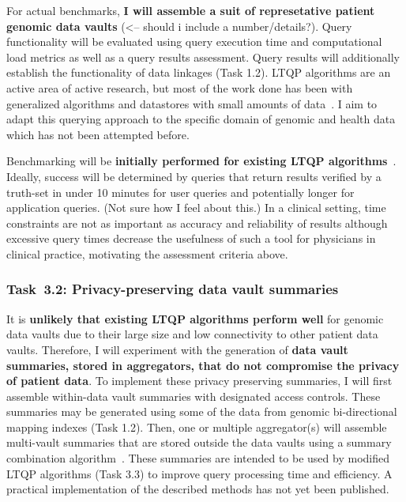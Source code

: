 \documentclass[a4paper,11pt]{article}
\begin{document}
\begin{refsection}
For actual benchmarks, \textbf{I will assemble a suit of represetative patient genomic data vaults} (<-- should i include a number/details?).
Query functionality will be evaluated using query execution time and computational load metrics as well as a query results assessment. 
Query results will additionally establish the functionality of data linkages (Task 1.2).
LTQP algorithms are an active area of active research, but most of the work done has been with generalized algorithms and datastores with small amounts of data~\cite{taelman_LTQP_2023}.
I aim to adapt this querying approach to the specific domain of genomic and health data which has not been attempted before. 

Benchmarking will be \textbf{initially performed for existing LTQP algorithms}~\cite{taelman_LTQP_2023}.
Ideally, success will be determined by queries that return results verified by a truth-set in under 10 minutes for user queries and potentially longer for application queries. (Not sure how I feel about this.)
In a clinical setting, time constraints are not as important as accuracy and reliability of results although excessive query times decrease the usefulness of such a tool for physicians in clinical practice, motivating the assessment criteria above.


\newcommand\WPcb{Privacy-preserving data vault summaries}
\subsubsection{Task~3.2: \WPcb}

It is \textbf{unlikely that existing LTQP algorithms perform well} for genomic data vaults due to their large size and low connectivity to other patient data vaults.
Therefore, I will experiment with the generation of \textbf{data vault summaries, stored in aggregators, that do not compromise the privacy of patient data}. 
To implement these privacy preserving summaries, I will first assemble within-data vault summaries with designated access controls.
These summaries may be generated using some of the data from genomic bi-directional mapping indexes (Task 1.2).
Then, one or multiple aggregator(s) will assemble multi-vault summaries that are stored outside the data vaults using a summary combination algorithm~\cite{taelman_privacyAgg_2020}.
These summaries are intended to be used by modified LTQP algorithms (Task 3.3) to improve query processing time and efficiency. 
A practical implementation of the described methods has not yet been published.



\end{refsection}
\end{document}
